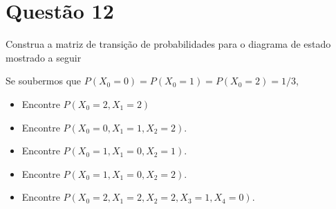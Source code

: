 \section{Questão 12}

Construa a matriz de transição de probabilidades para o diagrama de estado mostrado a seguir
%
\begin{figure}[htbp]
    \centering
\end{figure}

Se soubermos que $P(X_0 = 0) = P (X_0 = 1) = P (X_0 = 2) = 1/3$,
%
\begin{itemize}
    \item [a)] Encontre $P(X_0 = 2, X_1 = 2)$
    \item [b)] Encontre $P(X_0 = 0, X_1 = 1, X_2 = 2)$.
    \item [c)] Encontre $P(X_0 = 1, X_1 = 0, X_2 = 1)$.
    \item [d)] Encontre $P(X_0 = 1, X_1 = 0, X_2 = 2)$.
    \item [e)] Encontre $P(X_0 = 2, X_1 = 2, X_2 = 2, X_3 = 1,X_4 = 0)$.
\end{itemize}

